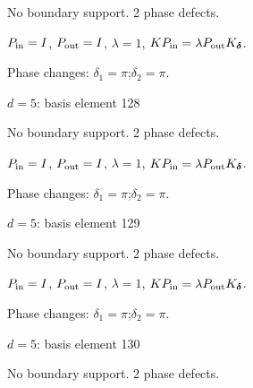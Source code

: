 No boundary support. 2 phase defects.
\begin{center}
\end{center}
\vspace{-1mm}
$P_{\rm in}=I$, \quad $P_{\rm out}=I$, \quad $\lambda=1$, \qquad $K P_{\rm in}=\lambda P_{\rm out}K_{\boldsymbol\delta}$.
\par\smallskip\begin{minipage}{.98\linewidth}\small Phase changes: $\delta_{1}=\pi$;\quad $\delta_{2}=\pi$.\end{minipage}
\vfill
{\footnotesize\texttt{}}
\newpage
{}
{\Large $d=5$: basis element 128}\par
No boundary support. 2 phase defects.
\begin{center}
\end{center}
\vspace{-1mm}
$P_{\rm in}=I$, \quad $P_{\rm out}=I$, \quad $\lambda=1$, \qquad $K P_{\rm in}=\lambda P_{\rm out}K_{\boldsymbol\delta}$.
\par\smallskip\begin{minipage}{.98\linewidth}\small Phase changes: $\delta_{1}=\pi$;\quad $\delta_{2}=\pi$.\end{minipage}
\vfill
{\footnotesize\texttt{}}
\newpage
{}
{\Large $d=5$: basis element 129}\par
No boundary support. 2 phase defects.
\begin{center}
\end{center}
\vspace{-1mm}
$P_{\rm in}=I$, \quad $P_{\rm out}=I$, \quad $\lambda=1$, \qquad $K P_{\rm in}=\lambda P_{\rm out}K_{\boldsymbol\delta}$.
\par\smallskip\begin{minipage}{.98\linewidth}\small Phase changes: $\delta_{1}=\pi$;\quad $\delta_{2}=\pi$.\end{minipage}
\vfill
{\footnotesize\texttt{}}
\newpage
{}
{\Large $d=5$: basis element 130}\par
No boundary support. 2 phase defects.
\begin{center}
\end{center}
